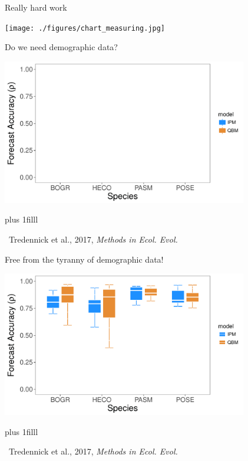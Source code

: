 \documentclass[12pt, compress, aspectratio=1610]{beamer}
\newcommand{\btVFill}{\vskip0pt plus 1filll}
\newcommand{\credit}[1]{\btVFill\par\hfill \footnotesize ~#1}
\let\OldTexttt\texttt
\renewcommand{\texttt}[1]{\OldTexttt{\color{codecolor}#1}}
\begin{document}
\begin{frame}{%
\protect\hypertarget{really-hard-work}{%
Really hard work}}

\texttt{[image: ./figures/chart\_measuring.jpg]}

\end{frame}

\begin{frame}{%
\protect\hypertarget{do-we-need-demographic-data}{%
Do we need demographic data?}}

\centering

\includegraphics[height=2.5in]{./figures/mee_forecast_accuracy_empty.pdf}

\credit{Tredennick et al., 2017, \emph{Methods in Ecol. Evol.}}

\end{frame}

\begin{frame}{%
\protect\hypertarget{free-from-the-tyranny-of-demographic-data}{%
Free from the tyranny of demographic data!}}

\centering

\includegraphics[height=2.5in]{./figures/mee_forecast_accuracy.pdf}

\credit{Tredennick et al., 2017, \emph{Methods in Ecol. Evol.}}

\end{frame}
\end{document}
